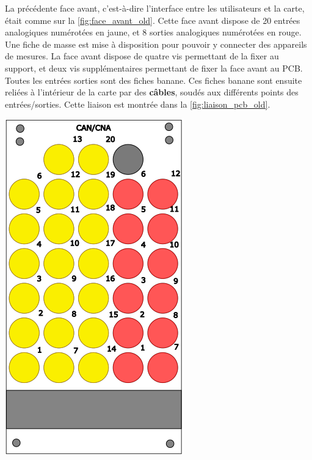 \documentclass{report}
\begin{document}
La précédente face avant, c'est-à-dire l'interface entre les utilisateurs et la carte, était comme sur la  \ref{fig:face_avant_old}.
Cette face avant dispose de 20 entrées analogiques numérotées en jaune, et 8 sorties analogiques numérotées en rouge. Une fiche de masse est mise à disposition pour pouvoir y connecter des appareils de mesures. La face avant dispose de quatre vis permettant de la fixer au support, et deux vis supplémentaires permettant de fixer la face avant au PCB. Toutes les entrées sorties sont des fiches banane. Ces fiches banane sont ensuite reliées à l'intérieur de la carte par des \textbf{câbles}, soudés aux différents points des entrées/sorties. Cette liaison est montrée dans la  \ref{fig:liaison_pcb_old}.
\bigbreak
\begin{minipage}{0.45\textwidth}
\centering
\includegraphics[scale=.6]{IMAGES/face_avant_old.png} 

\label{fig:face_avant_old}
\end{minipage}
\hfill
\end{document}
